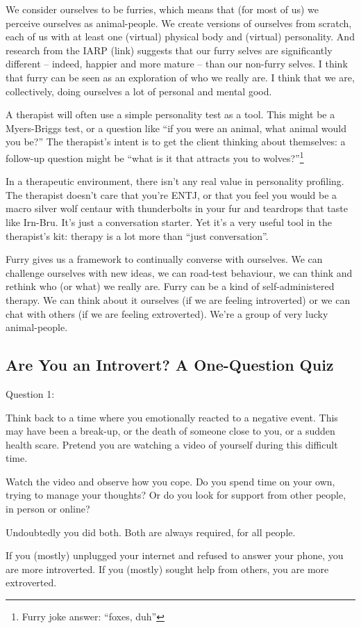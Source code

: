 We consider ourselves to be furries, which means that (for most of us) we perceive ourselves as animal-people. We create versions of ourselves from scratch, each of us with at least one (virtual) physical body and (virtual) personality. And research from the IARP (link) suggests that our furry selves are significantly different -- indeed, happier and more mature -- than our non-furry selves. I think that furry can be seen as an exploration of who we really are. I think that we are, collectively, doing ourselves a lot of personal and mental good.

A therapist will often use a simple personality test as a tool. This might be a Myers-Briggs test, or a question like ``if you were an animal, what animal would you be?'' The therapist's intent is to get the client thinking about themselves: a follow-up question might be ``what is it that attracts you to wolves?''\footnote{Furry joke answer: ``foxes, duh''}

In a therapeutic environment, there isn't any real value in personality profiling. The therapist doesn't care that you're ENTJ, or that you feel you would be a macro silver wolf centaur with thunderbolts in your fur and teardrops that taste like Irn-Bru. It's just a conversation starter. Yet it's a very useful tool in the therapist's kit: therapy is a lot more than ``just conversation''.

Furry gives us a framework to continually converse with ourselves. We can challenge ourselves with new ideas, we can road-test behaviour, we can think and rethink who (or what) we really are. Furry can be a kind of self-administered therapy. We can think about it ourselves (if we are feeling introverted) or we can chat with others (if we are feeling extroverted). We're a group of very lucky animal-people.

\secdiv

\subsection*{Are You an Introvert? A One-Question Quiz}

Question 1:

Think back to a time where you emotionally reacted to a negative event. This may have been a break-up, or the death of someone close to you, or a sudden health scare. Pretend you are watching a video of yourself during this difficult time.

Watch the video and observe how you cope. Do you spend time on your own, trying to manage your thoughts? Or do you look for support from other people, in person or online?

Undoubtedly you did both. Both are always required, for all people.

If you (mostly) unplugged your internet and refused to answer your phone, you are more introverted. If you (mostly) sought help from others, you are more extroverted.
